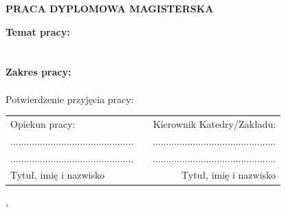 {  \begin{center}
    \vspace{1cm}
    \Large{\textbf{\uppercase{Praca dyplomowa magisterska}}}
  \end{center}
  \vspace{1cm}
	
		\noindent\textbf{Temat pracy:} \\
		\@title\\
		\\
		\noindent\textbf{Zakres pracy:} \\
		\@descr\\
		
		\vspace{2.5cm}
		\noindent{}Potwierdzenie przyjęcia pracy:
		\vspace{1cm}
		
		\noindent
		\begin{tabularx}{0.96\textwidth}{@{}lXr@{}}
			Opiekun pracy: & & Kierownik Katedry/Zakładu: \\ 
			.............................................. & & .............................................. \\
			.............................................. & & .............................................. \\
			Tytuł, imię i nazwisko & & Tytuł, imię i nazwisko \\
		\end{tabularx}
		
		\begin{center}
			\@miasto, \@date
		\end{center}
	
	\pagebreak
	\addtolength{\hoffset}{0.5cm}
	\addtolength{\voffset}{1.5cm}
	\addtolength{\textwidth}{-0.5cm}
}

\makeatother

